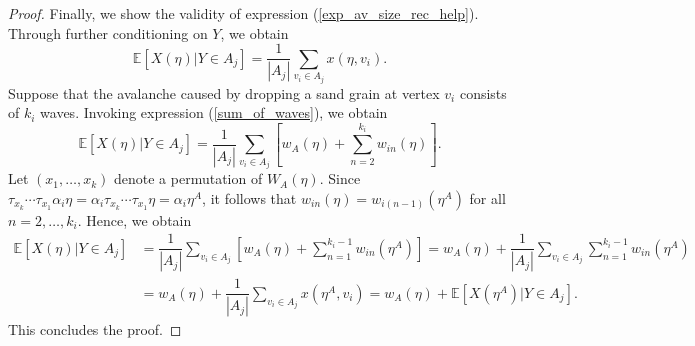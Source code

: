 \documentclass[10pt,a4paper]{amsart}
\begin{document}
\begin{proof}
    Finally, we show the validity of expression (\ref{exp_av_size_rec_help}). Through further conditioning on $Y$, we obtain
    \begin{equation*}
        \mathbb{E}[X(\eta)|Y \in A_j] =  \dfrac{1}{|A_j|}\sum\limits_{v_i \in A_j} x(\eta, v_i) . 
    \end{equation*}
    Suppose that the avalanche caused by dropping a sand grain at vertex $v_i$ consists of $k_i$ waves. Invoking expression (\ref{sum_of_waves}), we obtain
    \begin{equation*}
        \mathbb{E}[X(\eta)|Y \in A_j] = \dfrac{1}{|A_j|} \sum\limits_{v_i \in A_j} \left[w_A(\eta) + \sum\limits_{n=2}^{k_i} w_{in}(\eta) \right].
    \end{equation*}
    Let $(x_1, \ldots, x_k)$ denote a permutation of $W_A(\eta)$. Since $\tau_{x_k} \cdots \tau_{x_1} \alpha_i \eta = \alpha_i \tau_{x_k} \cdots \tau_{x_1} \eta = \alpha_i \eta^A$, it follows that $w_{in}(\eta) = w_{i(n-1)}(\eta^A)$ for all $n = 2, \ldots, k_i$. Hence, we obtain
    \begin{align*}
        \mathbb{E}[X(\eta)|Y \in A_j] &= \dfrac{1}{|A_j|} \sum\limits_{v_i \in A_j} \left[w_A(\eta) + \sum\limits_{n=1}^{k_i-1}w_{in}(\eta^A)\right] = w_A(\eta) + \dfrac{1}{|A_j|} \sum\limits_{v_i \in A_j} \sum\limits_{n=1}^{k_i-1} w_{in}(\eta^A) \\
        &= w_A(\eta) + \dfrac{1}{|A_j|} \sum\limits_{v_i \in A_j} x(\eta^A, v_i) = w_A(\eta) + \mathbb{E}[X(\eta^A)|Y \in A_j].
    \end{align*}
    This concludes the proof.
\end{proof}
\end{document}

